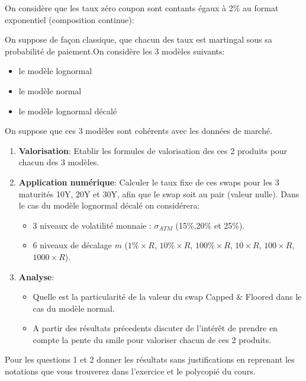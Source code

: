 \documentclass{article}
\begin{document}
\vspace{0.5cm}

On considère que les taux zéro coupon sont contants égaux à 2\% au format exponentiel (composition continue):\\

\vspace{0.5cm}

On suppose de façon classique, que chacun des taux est martingal sous sa probabilité de paiement.On considère les 3 modèles suivants:
\begin{itemize}
\item le modèle lognormal
\item le modèle normal
\item le modèle lognormal décalé
\end{itemize}
\vspace{0.5cm}
On suppose que ces 3 modèles sont cohérents avec les données de marché.
\begin{enumerate}
\item \textbf{Valorisation}: Etablir les formules de valorisation des ces 2 produits pour chacun des 3 modèles.
\item \textbf{Application numérique}: Calculer le taux fixe de ces swaps pour les 3 maturités 10Y, 20Y et 30Y, afin que le swap soit au pair (valeur nulle). Dans le cas du modèle lognormal décalé on considérera:
\begin{itemize}
\item 3 niveaux de volatilité monnaie : $\sigma_{ATM}$ (15\%,20\% et 25\%). 
\item 6 niveaux de décalage $m$ ($1\% \times R$, $10\% \times R$, $100\% \times R$, $10 \times R$, $100 \times R$, $1000 \times R$).
\end{itemize}
\item \textbf{Analyse}:
\begin{itemize}
\item Quelle est la particularité de la valeur du swap Capped \& Floored dans le cas du modèle normal.
\item A partir des résultats précedents discuter de l'intérêt de prendre en compte la pente du smile pour valoriser chacun de ces 2 produits.
\end{itemize} 
\end{enumerate}
Pour les questions 1 et 2 donner les résultats sans justifications en reprenant les notations que vous trouverez dans l'exercice et le polycopié du cours.
\end{document}
